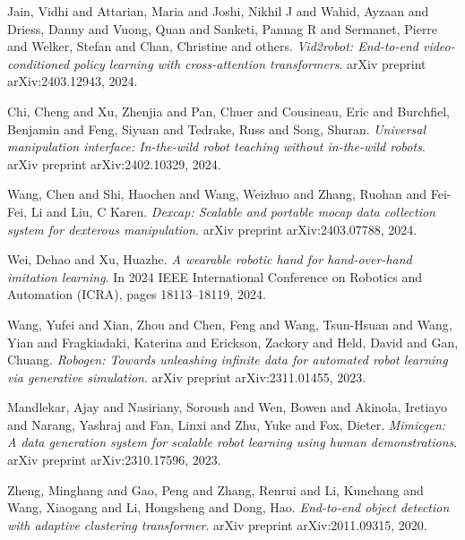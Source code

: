\documentclass[a4paper]{article}
\begin{document}
\begin{thebibliography}{99}
Jain, Vidhi and Attarian, Maria and Joshi, Nikhil J and Wahid, Ayzaan and Driess, Danny and Vuong, Quan and Sanketi, Pannag R and Sermanet, Pierre and Welker, Stefan and Chan, Christine and others. \textit{Vid2robot: End-to-end video-conditioned policy learning with cross-attention transformers}. arXiv preprint arXiv:2403.12943, 2024.

Chi, Cheng and Xu, Zhenjia and Pan, Chuer and Cousineau, Eric and Burchfiel, Benjamin and Feng, Siyuan and Tedrake, Russ and Song, Shuran. \textit{Universal manipulation interface: In-the-wild robot teaching without in-the-wild robots}. arXiv preprint arXiv:2402.10329, 2024.

Wang, Chen and Shi, Haochen and Wang, Weizhuo and Zhang, Ruohan and Fei-Fei, Li and Liu, C Karen. \textit{Dexcap: Scalable and portable mocap data collection system for dexterous manipulation}. arXiv preprint arXiv:2403.07788, 2024.

Wei, Dehao and Xu, Huazhe. \textit{A wearable robotic hand for hand-over-hand imitation learning}. In 2024 IEEE International Conference on Robotics and Automation (ICRA), pages 18113--18119, 2024.

Wang, Yufei and Xian, Zhou and Chen, Feng and Wang, Tsun-Hsuan and Wang, Yian and Fragkiadaki, Katerina and Erickson, Zackory and Held, David and Gan, Chuang. \textit{Robogen: Towards unleashing infinite data for automated robot learning via generative simulation}. arXiv preprint arXiv:2311.01455, 2023.

Mandlekar, Ajay and Nasiriany, Soroush and Wen, Bowen and Akinola, Iretiayo and Narang, Yashraj and Fan, Linxi and Zhu, Yuke and Fox, Dieter. \textit{Mimicgen: A data generation system for scalable robot learning using human demonstrations}. arXiv preprint arXiv:2310.17596, 2023.

Zheng, Minghang and Gao, Peng and Zhang, Renrui and Li, Kunchang and Wang, Xiaogang and Li, Hongsheng and Dong, Hao. \textit{End-to-end object detection with adaptive clustering transformer}. arXiv preprint arXiv:2011.09315, 2020.
\end{thebibliography}
\end{document}
